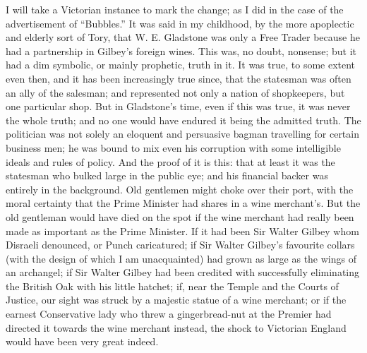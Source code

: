 \documentclass{book}
\begin{document}
I will take a Victorian instance to mark the change; as I did in the case of the advertisement of “Bubbles.” It was said in my childhood, by the more apoplectic and elderly sort of Tory, that W. E. Gladstone was only a Free Trader because he had a partnership in Gilbey’s foreign wines. This was, no doubt, nonsense; but it had a dim symbolic, or mainly prophetic, truth in it. It was true, to some extent even then, and it has been increasingly true since, that the statesman was often an ally of the salesman; and represented not only a nation of shopkeepers, but one particular shop. But in Gladstone’s time, even if this was true, it was never the whole truth; and no one would have endured it being the admitted truth. The politician was not solely an eloquent and persuasive bagman travelling for certain business men; he was bound to mix even his corruption with some intelligible ideals and rules of policy. And the proof of it is this: that at least it was the statesman who bulked large in the public eye; and his financial backer was entirely in the background. Old gentlemen might choke over their port, with the moral certainty that the Prime Minister had shares in a wine merchant’s. But the old gentleman would have died on the spot if the wine merchant had really been made as important as the Prime Minister. If it had been Sir Walter Gilbey whom Disraeli denounced, or Punch caricatured; if Sir Walter Gilbey’s favourite collars (with the design of which I am unacquainted) had grown as large as the wings of an archangel; if Sir Walter Gilbey had been credited with successfully eliminating the British Oak with his little hatchet; if, near the Temple and the Courts of Justice, our sight was struck by a majestic statue of a wine merchant; or if the earnest Conservative lady who threw a gingerbread-nut at the Premier had directed it towards the wine merchant instead, the shock to Victorian England would have been very great indeed.
\end{document}
